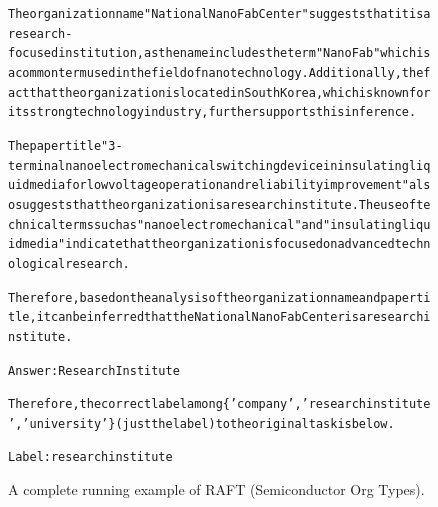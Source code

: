 \begin{figure}[t]
{{\begin{alltt}
The organization name "National NanoFab Center" suggests that it is a research-focused institution, as the name includes the term "NanoFab" which is a common term used in the field of nanotechnology. Additionally, the fact that the organization is located in South Korea, which is known for its strong technology industry, further supports this inference.

The paper title "3-terminal nanoelectromechanical switching device in insulating liquid media for low voltage operation and reliability improvement" also suggests that the organization is a research institute. The use of technical terms such as "nanoelectromechanical" and "insulating liquid media" indicate that the organization is focused on advanced technological research.

Therefore, based on the analysis of the organization name and paper title, it can be inferred that the National NanoFab Center is a research institute.

Answer: Research Institute

Therefore, the correct label among \{'company', 'research institute', 'university'\} (just the label) to the original task is below.

Label: research institute
\end{alltt}
}}
\caption{A complete running example of RAFT (Semiconductor Org Types).}
\label{fig:raft_subset=semiconductor_org_types_example}
\end{figure}
